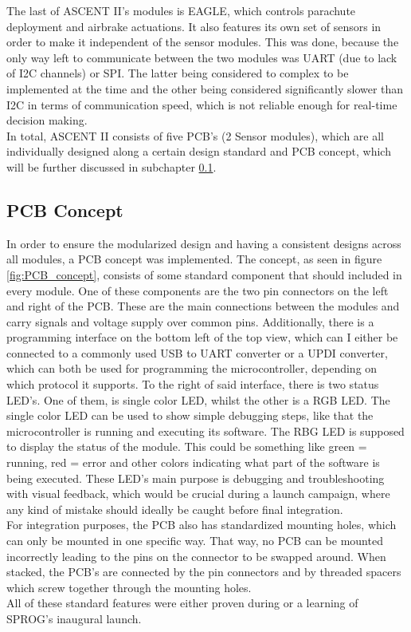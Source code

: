 \documentclass[fontsize=11pt,%
twoside,%
BCOR          = 8mm, %
DIV           = 11,  %
titlepage     = off,%
index=totoc,%
xcolor        = pdftex,%
dvipsnames,%
bibliography  = totoc,%
bibliography = numbered, %
listof        = notnumbered]{scrreprt}
\begin{document}
The last of ASCENT II's modules is EAGLE, which controls parachute deployment and airbrake actuations. It also features its own set of sensors in order to make it independent of the sensor modules. This was done, because the only way left to communicate between the two modules was UART (due to lack of I2C channels) or SPI. The latter being considered to complex to be implemented at the time and the other being considered significantly slower than I2C in terms of communication speed, which is not reliable enough for real-time decision making.\\
In total, ASCENT II consists of five PCB's (2 Sensor modules), which are all individually designed along a certain design standard and PCB concept, which will be further discussed in subchapter \ref{sec:PCB_concept}.

\subsection{PCB Concept} \label{sec:PCB_concept}
In order to ensure the modularized design and having a consistent designs across all modules, a PCB concept was implemented. The concept, as seen in figure \ref{fig:PCB_concept}, consists of some standard component that should included in every module. One of these components are the two pin connectors on the left and right of the PCB. These are the main connections between the modules and carry signals and voltage supply over common pins. Additionally, there is a programming interface on the bottom left of the top view, which can I either be connected to a commonly used USB to UART converter or a UPDI converter, which can both be used for programming the microcontroller, depending on which protocol it supports. To the right of said interface, there is two status LED's. One of them, is single color LED, whilst the other is a RGB LED. The single color LED can be used to show simple debugging steps, like that the microcontroller is running and executing its software. The RBG LED is supposed to display the status of the module. This could be something like green = running, red = error and other colors indicating what part of the software is being executed. These LED's main purpose is debugging and troubleshooting with visual feedback, which would be crucial during a launch campaign, where any kind of mistake should ideally be caught before final integration.\\
For integration purposes, the PCB also has standardized mounting holes, which can only be mounted in one specific way. That way, no PCB can be mounted incorrectly leading to the pins on the connector to be swapped around. When stacked, the PCB's are connected by the pin connectors and by threaded spacers which screw together through the mounting holes.\\
All of these standard features were either proven during or a learning of SPROG's inaugural launch.
\end{document}
